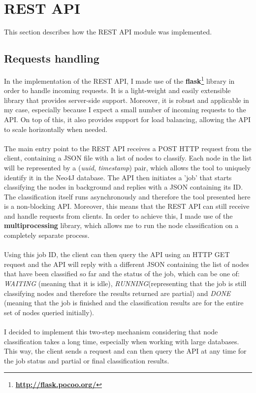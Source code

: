 	\section{REST API} \label{Section: impl/REST}
	This section describes how the REST API module was implemented.
	\subsection{Requests handling} \label{Section: impl/REST/actual}
	In the implementation of the REST API, I made use of the \textbf{flask}\footnote{\textbf{\url{http://flask.pocoo.org/}}} library in order to handle incoming requests. It is a light-weight and easily extensible library that provides server-side support. Moreover, it is robust and applicable in my case, especially because I expect a small number of incoming requests to the API. On top of this, it also provides support for load balancing, allowing the API to scale horizontally when needed.
	\\ \\
	The main entry point to the REST API receives a POST HTTP request from the client, containing a JSON file with a list of nodes to classify. Each node in the list will be represented by a (\textit{uuid}, \textit{timestamp}) pair, which allows the tool to uniquely identify it in the Neo4J database. The API then initiates a 'job' that starts classifying the nodes in background and replies with a JSON containing its ID. The classification itself runs asynchronously and therefore the tool presented here is a non-blocking API. Moreover, this means that the REST API can still receive and handle requests from clients. In order to achieve this, I made use of the \textbf{multiprocessing} library, which allows me to run the node classification on a completely separate process.
	\\ \\
	Using this job ID, the client can then query the API using an HTTP GET request and the API will reply with a different JSON containing the list of nodes that have been classified so far and the status of the job, which can be one of: \textit{WAITING} (meaning that it is idle), \textit{RUNNING}(representing that the job is still classifying nodes and therefore the results returned are partial) and \textit{DONE} (meaning that the job is finished and the classification results are for the entire set of nodes queried initially). 
	\\ \\
	I decided to implement this two-step mechanism considering that node classification takes a long time, especially when working with large databases. This way, the client sends a request and can then query the API at any time for the job status and partial or final classification results. 
